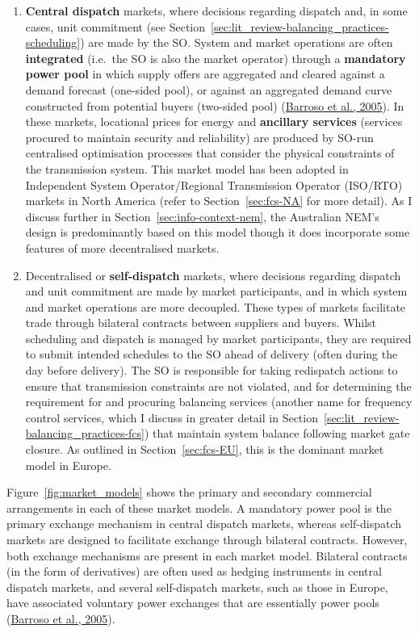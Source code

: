 \documentclass[12pt,a4paper,]{report}
\begin{document}
\begin{enumerate}
\def\labelenumi{\arabic{enumi}.}
\item
  \textbf{Central dispatch} markets, where decisions regarding dispatch
  and, in some cases, unit commitment (see
  Section~\ref{sec:lit_review-balancing_practices-scheduling}) are made
  by the SO. System and market operations are often \textbf{integrated}
  (i.e.~the SO is also the market operator) through a \textbf{mandatory
  power pool} in which supply offers are aggregated and cleared against
  a demand forecast (one-sided pool), or against an aggregated demand
  curve constructed from potential buyers (two-sided pool)
  (\protect\hyperlink{ref-barrosoClassificationElectricityMarket2005}{Barroso
  et al., 2005}). In these markets, locational prices for energy and
  \textbf{ancillary services} (services procured to maintain security
  and reliability) are produced by SO-run centralised optimisation
  processes that consider the physical constraints of the transmission
  system. This market model has been adopted in Independent System
  Operator/Regional Transmission Operator (ISO/RTO) markets in North
  America (refer to Section~\ref{sec:fcs-NA} for more detail). As I
  discuss further in Section~\ref{sec:info-context-nem}, the Australian
  NEM's design is predominantly based on this model though it does
  incorporate some features of more decentralised markets.
\item
  Decentralised or \textbf{self-dispatch} markets, where decisions
  regarding dispatch and unit commitment are made by market
  participants, and in which system and market operations are more
  decoupled. These types of markets facilitate trade through bilateral
  contracts between suppliers and buyers. Whilst scheduling and dispatch
  is managed by market participants, they are required to submit
  intended schedules to the SO ahead of delivery (often during the day
  before delivery). The SO is responsible for taking redispatch actions
  to ensure that transmission constraints are not violated, and for
  determining the requirement for and procuring balancing services
  (another name for frequency control services, which I discuss in
  greater detail in
  Section~\ref{sec:lit_review-balancing_practices-fcs}) that maintain
  system balance following market gate closure. As outlined in
  Section~\ref{sec:fcs-EU}, this is the dominant market model in Europe.
\end{enumerate}

Figure~\ref{fig:market_models} shows the primary and secondary
commercial arrangements in each of these market models. A mandatory
power pool is the primary exchange mechanism in central dispatch
markets, whereas self-dispatch markets are designed to facilitate
exchange through bilateral contracts. However, both exchange mechanisms
are present in each market model. Bilateral contracts (in the form of
derivatives) are often used as hedging instruments in central dispatch
markets, and several self-dispatch markets, such as those in Europe,
have associated voluntary power exchanges that are essentially power
pools
(\protect\hyperlink{ref-barrosoClassificationElectricityMarket2005}{Barroso
et al., 2005}).
\end{document}
